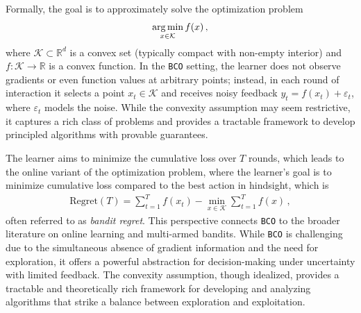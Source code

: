 \documentclass[letter, 12pt]{report}
\newcommand{\argmin}{\operatornamewithlimits{arg\,min}}
\newcommand{\cK}{\mathcal K}
\newcommand{\1}{\mathbf{1}}
\newcommand{\bco}{\texttt{BCO}\xspace}
\theoremstyle{plain}
\theoremstyle{definition}
\theoremstyle{remark}
\begin{document}
Formally, the goal is to approximately solve the optimization problem
\begin{align}
    \argmin_{x \in \cK} f(x)\,,
\end{align}
where \( \cK \subset \mathbb{R}^d \) is a convex set (typically compact with non-empty interior) and \( f : \cK \to \mathbb{R} \) is a convex function.
In the \bco setting, the learner does not observe gradients or even function values at arbitrary points;
instead, in each round of interaction it selects a point \( x_t \in \cK \) and receives noisy feedback \( y_t = f(x_t) + \varepsilon_t \), where \( \varepsilon_t \) models the noise.
While the convexity assumption may seem restrictive, it captures a rich class of problems and provides a tractable framework to develop principled algorithms with provable guarantees.

The learner aims to minimize the cumulative loss over \( T \) rounds,
which leads to the online variant of the optimization problem, where the learner’s goal is to minimize
cumulative loss compared to the best action in hindsight, which is
\begin{align}
    \text{Regret}(T) = \sum_{t=1}^T f(x_t) - \min_{x \in \cK} \sum_{t=1}^T f(x)\,,
\end{align}
often referred to as \emph{bandit regret}. This perspective connects \bco to the broader literature on online learning and multi-armed bandits. While \bco is challenging due to the simultaneous absence of gradient information and the need for exploration, it offers a powerful abstraction for decision-making under uncertainty with limited feedback. The convexity assumption, though idealized, provides a tractable and theoretically rich framework for developing and analyzing algorithms that strike a balance between exploration and exploitation.
\end{document}
